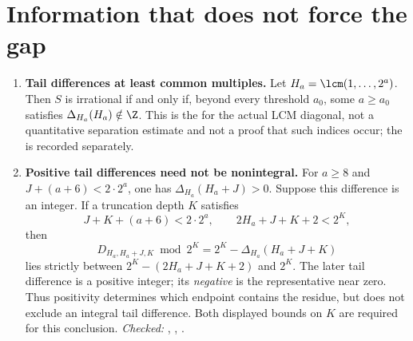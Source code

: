 \documentclass[11pt]{article}
\begin{document}
\section{Information that does not force the gap}\label{sec:nogo}
\begin{enumerate}
\item\label{res:actualorbit}
\textbf{Tail differences at least common multiples.}  Let
$H_a=\lcm(1,\ldots,2^a)$. Then $S$ is irrational if and only if,
beyond every threshold $a_0$, some $a\ge a_0$ satisfies
$\Delta_{H_a}(H_a)\notin\Z$.  This is the
for the actual LCM diagonal, not a quantitative
separation estimate and not a proof that such indices occur; the
is recorded separately.

\item\label{res:actualsign}
\textbf{Positive tail differences need not be nonintegral.} For $a\ge8$ and
$J+(a+6)<2\cdot2^a$, one has $\Delta_{H_a}(H_a+J)>0$.
Suppose this difference is an integer. If a truncation depth $K$ satisfies
\[
 J+K+(a+6)<2\cdot2^a,
 \qquad 2H_a+J+K+2<2^K,
\]
then
\[
 D_{H_a,H_a+J,K}\bmod2^K
   =2^K-\Delta_{H_a}(H_a+J+K)
\]
lies strictly between $2^K-(2H_a+J+K+2)$ and $2^K$.
The later tail difference is a positive integer; its \emph{negative} is
the representative near zero. Thus positivity determines which endpoint
contains the residue, but does not exclude an integral tail difference.
Both displayed bounds on $K$ are required for this conclusion.
{\footnotesize\emph{Checked:}
,
,
.}


\end{enumerate}
\end{document}

